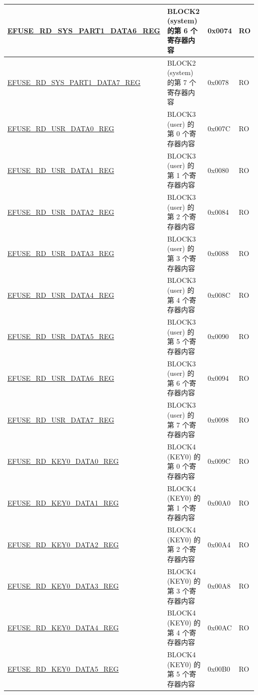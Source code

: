\begin{longtable}{ | p{6.8cm} | p{7cm} | p{1.3cm} | p{1.2cm} | }
\hyperref[regdesc:EFUSERDSYSPART1DATA6REG]{EFUSE\_RD\_SYS\_PART1\_DATA6\_REG} & BLOCK2 (system) 的第 6 个寄存器内容 & 0x0074 & RO \\ \hline
\hyperref[regdesc:EFUSERDSYSPART1DATA7REG]{EFUSE\_RD\_SYS\_PART1\_DATA7\_REG} & BLOCK2 (system) 的第 7 个寄存器内容 & 0x0078 & RO \\ \hline
\hyperref[regdesc:EFUSERDUSRDATA0REG]{EFUSE\_RD\_USR\_DATA0\_REG} & BLOCK3 (user) 的第 0 个寄存器内容 & 0x007C & RO \\ \hline
\hyperref[regdesc:EFUSERDUSRDATA1REG]{EFUSE\_RD\_USR\_DATA1\_REG} & BLOCK3 (user) 的第 1 个寄存器内容 & 0x0080 & RO \\ \hline
\hyperref[regdesc:EFUSERDUSRDATA2REG]{EFUSE\_RD\_USR\_DATA2\_REG} & BLOCK3 (user) 的第 2 个寄存器内容 & 0x0084 & RO \\ \hline
\hyperref[regdesc:EFUSERDUSRDATA3REG]{EFUSE\_RD\_USR\_DATA3\_REG} & BLOCK3 (user) 的第 3 个寄存器内容 & 0x0088 & RO \\ \hline
\hyperref[regdesc:EFUSERDUSRDATA4REG]{EFUSE\_RD\_USR\_DATA4\_REG} & BLOCK3 (user) 的第 4 个寄存器内容 & 0x008C & RO \\ \hline
\hyperref[regdesc:EFUSERDUSRDATA5REG]{EFUSE\_RD\_USR\_DATA5\_REG} & BLOCK3 (user) 的第 5 个寄存器内容 & 0x0090 & RO \\ \hline
\hyperref[regdesc:EFUSERDUSRDATA6REG]{EFUSE\_RD\_USR\_DATA6\_REG} & BLOCK3 (user) 的第 6 个寄存器内容 & 0x0094 & RO \\ \hline
\hyperref[regdesc:EFUSERDUSRDATA7REG]{EFUSE\_RD\_USR\_DATA7\_REG} & BLOCK3 (user) 的第 7 个寄存器内容 & 0x0098 & RO \\ \hline
\hyperref[regdesc:EFUSERDKEY0DATA0REG]{EFUSE\_RD\_KEY0\_DATA0\_REG} & BLOCK4 (KEY0) 的第 0 个寄存器内容 & 0x009C & RO \\ \hline
\hyperref[regdesc:EFUSERDKEY0DATA1REG]{EFUSE\_RD\_KEY0\_DATA1\_REG} & BLOCK4 (KEY0) 的第 1 个寄存器内容 & 0x00A0 & RO \\ \hline
\hyperref[regdesc:EFUSERDKEY0DATA2REG]{EFUSE\_RD\_KEY0\_DATA2\_REG} & BLOCK4 (KEY0) 的第 2 个寄存器内容 & 0x00A4 & RO \\ \hline
\hyperref[regdesc:EFUSERDKEY0DATA3REG]{EFUSE\_RD\_KEY0\_DATA3\_REG} & BLOCK4 (KEY0) 的第 3 个寄存器内容 & 0x00A8 & RO \\ \hline
\hyperref[regdesc:EFUSERDKEY0DATA4REG]{EFUSE\_RD\_KEY0\_DATA4\_REG} & BLOCK4 (KEY0) 的第 4 个寄存器内容 & 0x00AC & RO \\ \hline
\hyperref[regdesc:EFUSERDKEY0DATA5REG]{EFUSE\_RD\_KEY0\_DATA5\_REG} & BLOCK4 (KEY0) 的第 5 个寄存器内容 & 0x00B0 & RO \\ \hline

\end{longtable}
